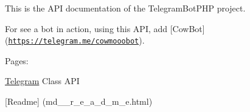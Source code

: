 \-This is the \-A\-P\-I documentation of the \-Telegram\-Bot\-P\-H\-P project.\par
 \-For see a bot in action, using this \-A\-P\-I, add \mbox{[}\-Cow\-Bot\mbox{]} (\href{https://telegram.me/cowmooobot}{\tt https\-://telegram.\-me/cowmooobot}).\par
 \-Pages\-:\par
 \hyperlink{class_telegram}{\-Telegram} \-Class \-A\-P\-I \par
 \mbox{[}\-Readme\mbox{]} (md\-\_\-\-\_\-r\-\_\-e\-\_\-a\-\_\-d\-\_\-m\-\_\-e.\-html) 